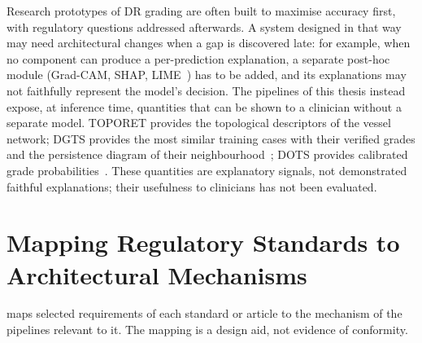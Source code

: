 Research prototypes of DR grading are often built to maximise accuracy first, with
regulatory questions addressed afterwards. A system designed in that way may need
architectural changes when a gap is discovered late: for example, when no component can
produce a per-prediction explanation, a separate post-hoc module (Grad-CAM, SHAP,
LIME~\cite{selvaraju2017gradcam,lundberg2017shap,ribeiro2016lime}) has to be added, and
its explanations may not faithfully represent the model's decision. The pipelines of this
thesis instead expose, at inference time, quantities that can be shown to a clinician
without a separate model. TOPORET provides the topological descriptors of the vessel
network; DGTS provides the most similar training cases with their verified grades and the
persistence diagram of their neighbourhood~\cite{belhadj2026dgts}; DOTS provides
calibrated grade probabilities~\cite{belhadj2026dots}. These quantities are explanatory signals, not demonstrated
faithful explanations; their usefulness to clinicians has not been evaluated.

\section{Mapping Regulatory Standards to Architectural Mechanisms}
\label{sec:regmap}

 maps selected requirements of each standard or article to the mechanism
of the pipelines relevant to it. The mapping is a design aid, not evidence of conformity.

